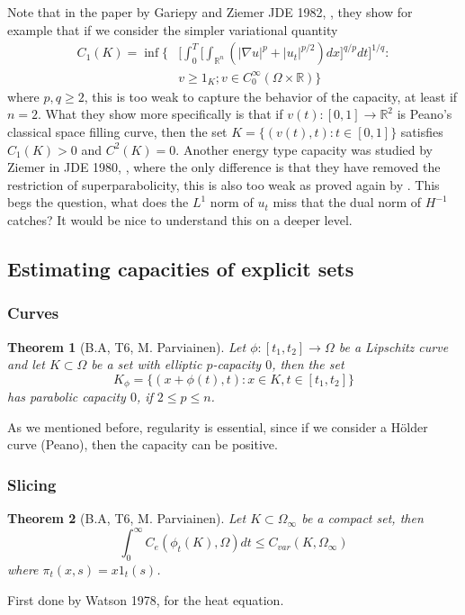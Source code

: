 \documentclass[reqno,a4paper,12pt]{amsart}
\newtheorem{theorem}{Theorem}[section]
\theoremstyle{definition}
\numberwithin{theorem}{section} \numberwithin{equation}{section}
\newcommand{\R}{{\mathbb R}}
\newcommand{\grad}{\nabla}
\begin{document}
Note that in the paper by Gariepy and Ziemer JDE 1982, \cite{GZ2}, they show for example that if we consider the simpler variational quantity
\begin{align*} \nonumber \label{}
	C_1(K) = \inf \bigg \{ &\bigg [\int_0^T \bigg [\int_{\R^n} (|\grad u|^p + |u_t|^{p/2}) dx \bigg ]^{q/p} dt \bigg ]^{1/q}: \\
	& v \geq 1_K; v \in C_0^\infty(\Omega \times \R) \bigg \}
\end{align*}
where $p, q \geq 2$, this is too weak to capture the behavior of the capacity, at least if $n=2$. What they show more specifically is that if $v(t):[0,1] \to \R^2$ is Peano's classical space filling curve, then the set $K = \{(v(t),t):t \in [0,1]\}$ satisfies $C_1(K) > 0$ and $C^2(K) = 0$.
Another energy type capacity was studied by Ziemer in JDE 1980, \cite{Z}, where the only difference is that they have removed the restriction of superparabolicity, this is also too weak as proved again by \cite{GZ2}.
This begs the question, what does the $L^1$ norm of $u_t$ miss that the dual norm of $H^{-1}$ catches? It would be nice to understand this on a deeper level.

\subsection{Estimating capacities of explicit sets}
\subsubsection{Curves}
\begin{theorem}[B.A, T6, M. Parviainen]
	Let $\phi:[t_1,t_2] \to \Omega$ be a Lipschitz curve and let $K \subset \Omega$ be a set with elliptic $p$-capacity $0$, then the set
	\begin{equation} \nonumber \label{}
		K_{\phi} = \{(x+\phi(t),t): x \in K, t \in [t_1,t_2]\}
	\end{equation}
	has parabolic capacity $0$, if $2 \leq p \leq n$.
\end{theorem}
As we mentioned before, regularity is essential, since if we consider a Hölder curve (Peano), then the capacity can be positive.

\subsubsection{Slicing}
\begin{theorem}[B.A, T6, M. Parviainen] \label{slicing}
	Let $K \subset \Omega_\infty$ be a compact set, then
	\begin{equation} \nonumber \label{}
		\int_0^\infty C_e(\phi_t(K),\Omega) dt \leq C_{var}(K,\Omega_\infty)
	\end{equation}
	where $\pi_t(x,s) = x 1_t(s)$.
\end{theorem}
First done by Watson 1978, \cite{W} for the heat equation.
\end{document}
